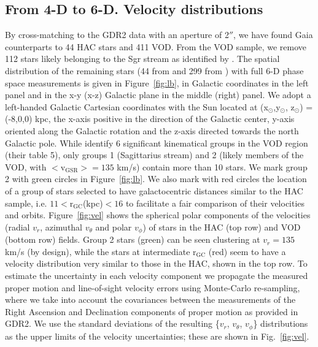 \documentclass[fleqn,usenatbib]{mnras}
\begin{document}
\subsection{From 4-D to 6-D. Velocity distributions}
%
By cross-matching to the GDR2 data with an aperture of 2$''$, we have
found Gaia counterparts to 44 HAC stars and 411 VOD. From the VOD
sample, we remove 112 stars likely belonging to the Sgr stream as
identified by \citep[][, their group 1]{Vivas2016}. The spatial
distribution of the remaining stars (44 from \citealt{Simion2018} and
299 from \citealt{Vivas2016}) with full 6-D phase space measurements
is given in Figure~\ref{fig:lb}, in Galactic coordinates in the left
panel and in the x-y (x-z) Galactic plane in the middle (right)
panel. We adopt a left-handed Galactic Cartesian coordinates with the
Sun located at (x$_{\odot}$,y$_{\odot}$, z$_{\odot}$) = (-8,0,0) kpc,
the x-axis positive in the direction of the Galactic center, y-axis
oriented along the Galactic rotation and the z-axis directed towards
the north Galactic pole. While \citealt{Vivas2016} identify 6
significant kinematical groups in the VOD region (their table 5), only
groups 1 (Sagittarius stream) and 2 (likely members of the VOD, with
$\mathrm{<v_{GSR}>}= 135$ km/s) contain more than 10 stars. We mark
group 2 with green circles in Figure~\ref{fig:lb}. We also mark with
red circles the location of a group of stars selected to have
galactocentric distances similar to the HAC sample, i.e.
$11\mathrm{<r_{GC}}$(kpc)$<16$ to facilitate a fair comparison of their
velocities and orbits.
%
Figure~\ref{fig:vel} shows the spherical polar components of the
velocities (radial $v_{r}$, azimuthal $v_{\theta}$ and polar
$v_{\phi}$) of stars in the HAC (top row) and VOD (bottom row)
fields. Group 2 stars (green) can be seen clustering at $v_{r} = 135$
km/s (by design), while the stars at intermediate $\mathrm{r_{GC}}$
(red) seem to have a velocity distribution very similar to those in
the HAC, shown in the top row. To estimate the uncertainty in each
velocity component we propagate the measured proper motion and
line-of-sight velocity errors using Monte-Carlo re-sampling, where we
take into account the covariances between the measurements of the
Right Ascension and Declination components of proper motion as
provided in GDR2. We use the standard deviations of the resulting
\{$v_{r}$, $v_{\theta}$, $v_{\phi}$\} distributions as the upper limits
of the velocity uncertainties; these are shown in Fig.~\ref{fig:vel}.
%
%
%
\end{document}
